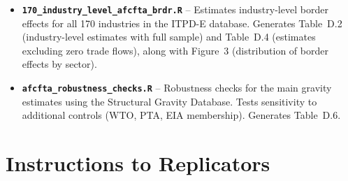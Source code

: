 \documentclass[12pt]{article}
\begin{document}
\begin{itemize}
	\item \textbf{\texttt{170\_industry\_level\_afcfta\_brdr.R}} -- Estimates industry-level border effects for all 170 industries in the ITPD-E database. Generates Table~D.2 (industry-level estimates with full sample) and Table~D.4 (estimates excluding zero trade flows), along with Figure~3 (distribution of border effects by sector).
	
	\item \textbf{\texttt{afcfta\_robustness\_checks.R}} -- Robustness checks for the main gravity estimates using the Structural Gravity Database. Tests sensitivity to additional controls (WTO, PTA, EIA membership). Generates Table~D.6.
\end{itemize}

\section{Instructions to Replicators}
\end{document}
